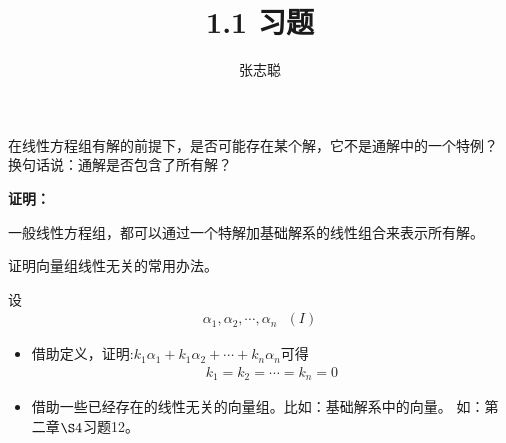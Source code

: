\documentclass{article}
\begin{document}
\title{1.1 习题}
\author{张志聪}
\maketitle

\begin{zremark}
  在线性方程组有解的前提下，是否可能存在某个解，它不是通解中的一个特例？
  换句话说：通解是否包含了所有解？
\end{zremark}

\textbf{证明：}

一般线性方程组，都可以通过一个特解加基础解系的线性组合来表示所有解。

\begin{zremark}
  证明向量组线性无关的常用办法。
\end{zremark}

设
\begin{align*}
  \alpha_1, \alpha_2, \cdots, \alpha_n \ \ \ (I)
\end{align*}

\begin{itemize}
  \item 借助定义，证明:$k_1\alpha_1 + k_1\alpha_2 + \cdots + k_n\alpha_n$可得
        \begin{align*}
          k_1 = k_2 = \cdots = k_n = 0
        \end{align*}

  \item 借助一些已经存在的线性无关的向量组。比如：基础解系中的向量。
        如：第二章$\S 4$习题12。
\end{itemize}
\end{document}
